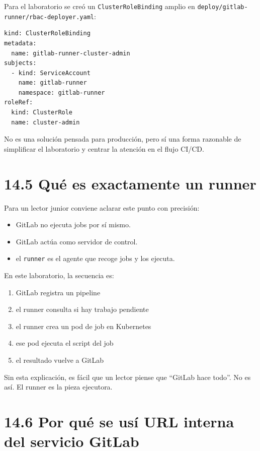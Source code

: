 \documentclass[
a4paper,
12pt]{report}
\providecommand{\tightlist}{%
  \setlength{\itemsep}{0pt}\setlength{\parskip}{0pt}}
\begin{document}
Para el laboratorio se creó un \texttt{ClusterRoleBinding} amplio en
\texttt{deploy/gitlab-runner/rbac-deployer.yaml}:

\begin{verbatim}
kind: ClusterRoleBinding
metadata:
  name: gitlab-runner-cluster-admin
subjects:
  - kind: ServiceAccount
    name: gitlab-runner
    namespace: gitlab-runner
roleRef:
  kind: ClusterRole
  name: cluster-admin
\end{verbatim}

No es una solución pensada para producción, pero sí una forma razonable
de simplificar el laboratorio y centrar la atención en el flujo CI/CD.

\section{14.5 Qué es exactamente un
runner}\label{quuxe9-es-exactamente-un-runner}

Para un lector junior conviene aclarar este punto con precisión:

\begin{itemize}
\tightlist
\item
  GitLab no ejecuta jobs por sí mismo.
\item
  GitLab actúa como servidor de control.
\item
  el \texttt{runner} es el agente que recoge jobs y los ejecuta.
\end{itemize}

En este laboratorio, la secuencia es:

\begin{enumerate}
\def\labelenumi{\arabic{enumi}.}
\tightlist
\item
  GitLab registra un pipeline
\item
  el runner consulta si hay trabajo pendiente
\item
  el runner crea un pod de job en Kubernetes
\item
  ese pod ejecuta el script del job
\item
  el resultado vuelve a GitLab
\end{enumerate}

Sin esta explicación, es fácil que un lector piense que ``GitLab hace
todo''. No es así. El runner es la pieza ejecutora.

\section{14.6 Por qué se usí URL interna del servicio
GitLab}\label{por-quuxe9-se-usuxed-url-interna-del-servicio-gitlab}
\end{document}
